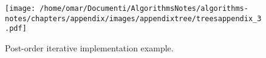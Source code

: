 \begin{figure}[H]
	\begin{center}
		\texttt{[image: /home/omar/Documenti/AlgorithmsNotes/algorithms-notes/chapters/appendix/images/appendixtree/treesappendix\_3.pdf]}
		\caption[Post-order iterative implementation example.]{Post-order iterative implementation example.}
		\label{appendixtrees_3}
	\end{center}
\end{figure}